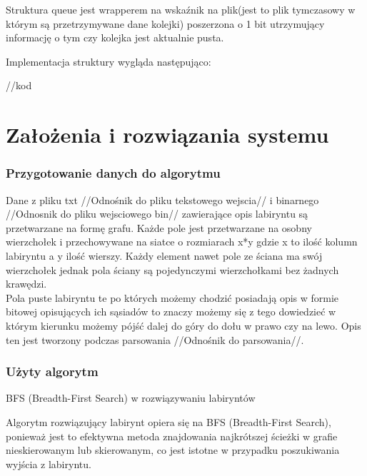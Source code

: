 \documentclass[
]{article}
\begin{document}
Struktura queue jest wrapperem na wskaźnik na plik(jest to plik
tymczasowy w którym są przetrzymywane dane kolejki) poszerzona o 1 bit
utrzymujący informację o tym czy kolejka jest aktualnie pusta.

Implementacja struktury wygląda następująco:

//kod

\hypertarget{zaux142oux17cenia-i-rozwiux105zania-systemu}{%
\section{Założenia i rozwiązania
systemu}\label{zaux142oux17cenia-i-rozwiux105zania-systemu}}

\hypertarget{przygotowanie-danych-do-algorytmu}{%
\subsubsection{\texorpdfstring{Przygotowanie danych do algorytmu
}{Przygotowanie danych do algorytmu }}\label{przygotowanie-danych-do-algorytmu}}

Dane z pliku txt //Odnośnik do pliku tekstowego wejscia// i binarnego
//Odnosnik do pliku wejsciowego bin// zawierające opis labiryntu są
przetwarzane na formę grafu. Każde pole jest przetwarzane na osobny
wierzchołek i przechowywane na siatce o rozmiarach x*y gdzie x to ilość
kolumn labiryntu a y ilość wierszy. Każdy element nawet pole ze ściana
ma swój wierzchołek jednak pola ściany są pojedynczymi wierzchołkami bez
żadnych krawędzi.\\
Pola puste labiryntu te po których możemy chodzić posiadają opis w
formie bitowej opisujących ich sąsiadów to znaczy możemy się z tego
dowiedzieć w którym kierunku możemy pójść dalej do góry do dołu w prawo
czy na lewo. Opis ten jest tworzony podczas parsowania //Odnośnik do
parsowania//.

\hypertarget{uux17cyty-algorytm}{%
\subsubsection{Użyty algorytm}\label{uux17cyty-algorytm}}

BFS (Breadth-First Search) w rozwiązywaniu labiryntów

Algorytm rozwiązujący labirynt opiera się na BFS (Breadth-First Search),
ponieważ jest to efektywna metoda znajdowania najkrótszej ścieżki w
grafie nieskierowanym lub skierowanym, co jest istotne w przypadku
poszukiwania wyjścia z labiryntu.
\end{document}
